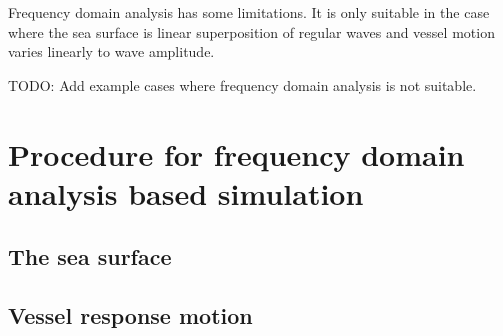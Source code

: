 Frequency domain analysis has some limitations. It is only suitable in the case
where the sea surface is linear superposition of regular waves and vessel motion
varies linearly to wave amplitude. 

TODO: Add example cases where frequency domain analysis is not suitable.


\section{Procedure for frequency domain analysis based simulation}
\subsection{The sea surface}
\subsection{Vessel response motion}


